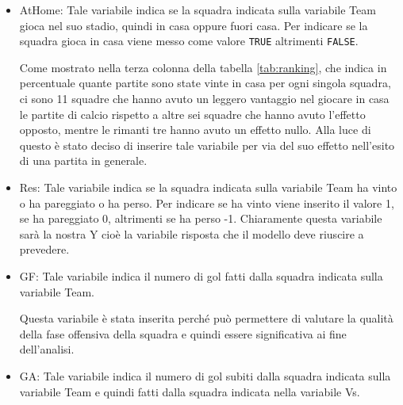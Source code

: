 \begin{itemize}
	\item \textsf{AtHome}: Tale variabile indica se la squadra indicata sulla variabile \textsf{Team} gioca nel suo stadio, quindi in casa oppure fuori casa. Per indicare se la squadra gioca in casa viene messo come valore \texttt{TRUE} altrimenti \texttt{FALSE}. 
	
	Come mostrato nella terza colonna della tabella \ref{tab:ranking}, che indica in percentuale quante partite sono state vinte in casa per ogni singola squadra, ci sono 11 squadre che hanno avuto un leggero vantaggio nel giocare in casa le partite di calcio rispetto a altre sei squadre che hanno avuto l'effetto opposto, mentre le rimanti tre hanno avuto un effetto nullo. Alla luce di questo è stato deciso di inserire tale variabile per via del suo effetto nell'esito di una partita in generale.
	\item \textsf{Res}: Tale variabile indica se la squadra indicata sulla variabile \textsf{Team} ha vinto o ha pareggiato o ha perso. Per indicare se ha vinto viene inserito il valore 1, se ha pareggiato 0, altrimenti se ha perso -1. Chiaramente questa variabile sarà la nostra Y cioè la variabile risposta che il modello deve riuscire a prevedere.
	\item \textsf{GF}: Tale variabile indica il numero di gol fatti dalla squadra indicata sulla variabile \textsf{Team}. 
	
	Questa variabile è stata inserita perché può permettere di valutare la qualità della fase offensiva della squadra e quindi essere significativa ai fine dell'analisi.
	\item \textsf{GA}: Tale variabile indica il numero di gol subiti dalla squadra indicata sulla variabile \textsf{Team} e quindi fatti dalla squadra indicata nella variabile \textsf{Vs}. 
	

\end{itemize}
